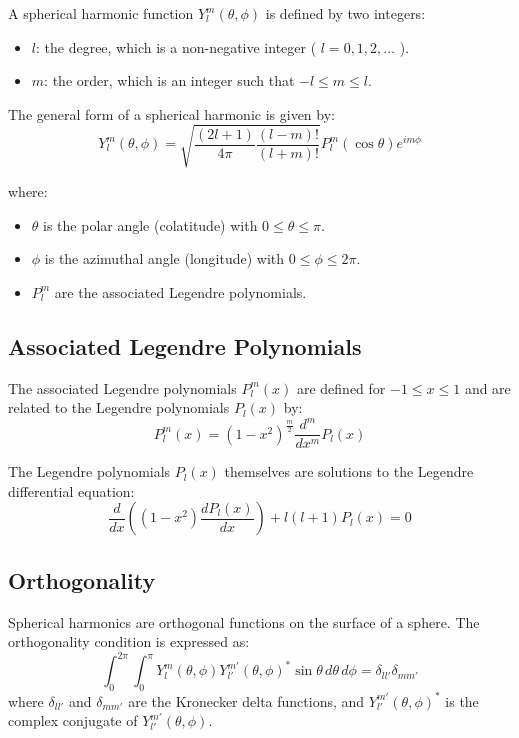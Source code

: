 A spherical harmonic function \( Y_l^m(\theta, \phi) \) is defined by two integers:
\begin{itemize}
	\item \( l \): the degree, which is a non-negative integer ( \( l = 0, 1, 2, \ldots \) ).
	\item \( m \): the order, which is an integer such that \( -l \leq m \leq l \).
\end{itemize}

The general form of a spherical harmonic is given by:
\[
Y_l^m(\theta, \phi) = \sqrt{\frac{(2l+1)}{4\pi} \frac{(l-m)!}{(l+m)!}} P_l^m(\cos \theta) e^{im\phi}
\]

where:
\begin{itemize}
	\item \( \theta \) is the polar angle (colatitude) with \( 0 \leq \theta \leq \pi \).
	\item \( \phi \) is the azimuthal angle (longitude) with \( 0 \leq \phi \leq 2\pi \).
	\item \( P_l^m \) are the associated Legendre polynomials.
\end{itemize}

\subsection*{Associated Legendre Polynomials}

The associated Legendre polynomials \( P_l^m(x) \) are defined for \( -1 \leq x \leq 1 \) and are related to the Legendre polynomials \( P_l(x) \) by:
\[
P_l^m(x) = (1 - x^2)^{\frac{m}{2}} \frac{d^m}{dx^m} P_l(x)
\]

The Legendre polynomials \( P_l(x) \) themselves are solutions to the Legendre differential equation:
\[
\frac{d}{dx} \left( (1 - x^2) \frac{d P_l(x)}{dx} \right) + l(l+1) P_l(x) = 0
\]

\subsection*{Orthogonality}

Spherical harmonics are orthogonal functions on the surface of a sphere. The orthogonality condition is expressed as:
\[
\int_0^{2\pi} \int_0^{\pi} Y_l^m(\theta, \phi) Y_{l'}^{m'}(\theta, \phi)^* \sin \theta \, d\theta \, d\phi = \delta_{ll'} \delta_{mm'}
\]
where \( \delta_{ll'} \) and \( \delta_{mm'} \) are the Kronecker delta functions, and \( Y_{l'}^{m'}(\theta, \phi)^* \) is the complex conjugate of \( Y_{l'}^{m'}(\theta, \phi) \).

